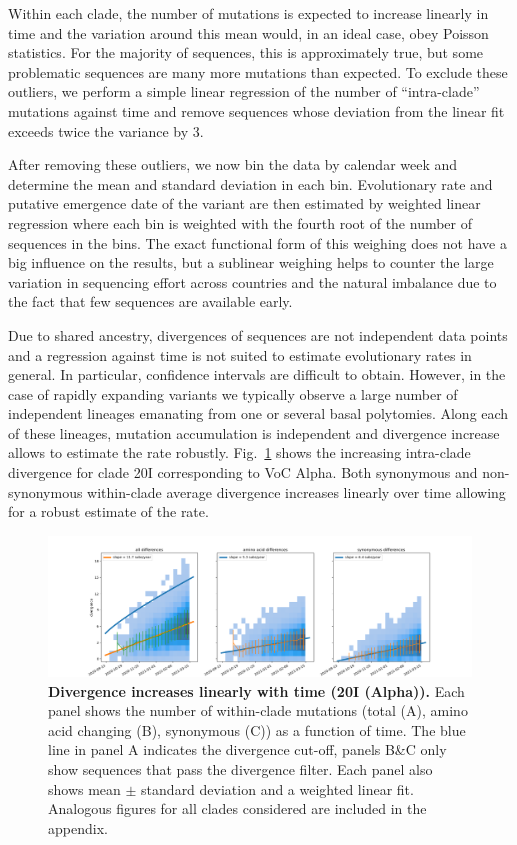 \documentclass[aps,rmp, twocolumn]{revtex4}
\begin{document}
Within each clade, the number of mutations is expected to increase linearly in time and the variation around this mean would, in an ideal case, obey Poisson statistics.
For the majority of sequences, this is approximately true, but some problematic sequences are many more mutations than expected.
To exclude these outliers, we perform a simple linear regression of the number of ``intra-clade'' mutations against time and remove sequences whose deviation from the linear fit exceeds twice the variance by 3.

After removing these outliers, we now bin the data by calendar week and determine the mean and standard deviation in each bin.
Evolutionary rate and putative emergence date of the variant are then estimated by weighted linear regression where each bin is weighted with the fourth root of the number of sequences in the bins.
The exact functional form of this weighing does not have a big influence on the results, but a sublinear weighing helps to counter the large variation in sequencing effort across countries and the natural imbalance due to the fact that few sequences are available early.

Due to shared ancestry, divergences of sequences are not independent data points and a regression against time is not suited to estimate evolutionary rates in general.
In particular, confidence intervals are difficult to obtain.
However, in the case of rapidly expanding variants we typically observe a large number of independent lineages emanating from one or several basal polytomies.
Along each of these lineages, mutation accumulation is independent and divergence increase allows to estimate the rate robustly.
Fig.~\ref{fig:rate_alpha} shows the increasing intra-clade divergence for clade 20I corresponding to VoC Alpha.
Both synonymous and non-synonymous within-clade average divergence increases linearly over time allowing for a robust estimate of the rate.

\begin{figure}[tb]
    \includegraphics[width=\textwidth]{figures/rtt/20I_rtt.png}
    \caption{{\bf Divergence increases linearly with time (20I (Alpha)).} Each panel shows the number of within-clade mutations (total (A), amino acid changing (B), synonymous (C)) as a function of time.
    The blue line in panel A indicates the divergence cut-off, panels B\&C only show sequences that pass the divergence filter. Each panel also shows mean $\pm$ standard deviation and a weighted linear fit. Analogous figures for all clades considered are included in the appendix.
    \label{fig:rate_alpha}}
\end{figure}
\end{document}
